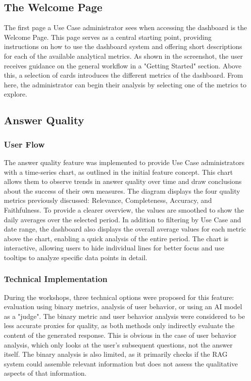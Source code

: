 \documentclass[
	english,
	ruledheaders=section,%
	class=report,%
	thesis={type=bachelor},%
	accentcolor=1b,%
	custommargins=true,%
	marginpar=false,%
	parskip=half-,%
	fontsize=11pt,%
	DIV=14,
]{tudapub}
\begin{document}
\subsection{The Welcome Page}
The first page a Use Case administrator sees when accessing the dashboard is the Welcome Page. This page serves as a central starting point, providing instructions on how to use the dashboard system and offering short descriptions for each of the available analytical metrics. As shown in the screenshot, the user receives guidance on the general workflow in a "Getting Started" section. Above this, a selection of cards introduces the different metrics of the dashboard. From here, the administrator can begin their analysis by selecting one of the metrics to explore.
\subsection{Answer Quality}
\subsubsection{User Flow}
The answer quality feature was implemented to provide Use Case administrators with a time-series chart, as outlined in the initial feature concept. This chart allows them to observe trends in answer quality over time and draw conclusions about the success of their own measures. The diagram displays the four quality metrics previously discussed: Relevance, Completeness, Accuracy, and Faithfulness. To provide a clearer overview, the values are smoothed to show the daily averages over the selected period. In addition to filtering by Use Case and date range, the dashboard also displays the overall average values for each metric above the chart, enabling a quick analysis of the entire period. The chart is interactive, allowing users to hide individual lines for better focus and use tooltips to analyze specific data points in detail.

\subsubsection{Technical Implementation}
During the workshops, three technical options were proposed for this feature: evaluation using binary metrics, analysis of user behavior, or using an AI model as a "judge". The binary metric and user behavior analysis were considered to be less accurate proxies for quality, as both methods only indirectly evaluate the content of the generated response. This is obvious in the case of user behavior analysis, which only looks at the user's subsequent questions, not the answer itself. The binary analysis is also limited, as it primarily checks if the RAG system could assemble relevant information but does not assess the qualitative aspects of that information.
\end{document}
